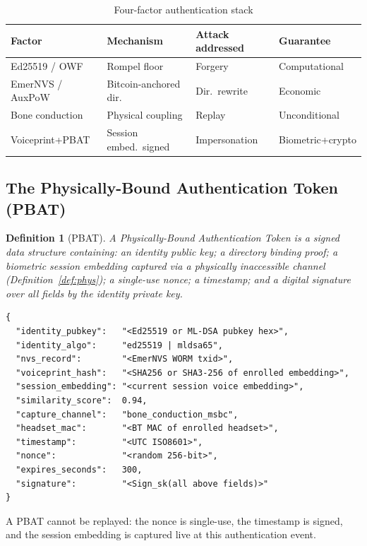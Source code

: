 \documentclass[12pt,a4paper]{article}
\newtheorem{definition}{Definition}
\begin{document}
\begin{table}[H]
\caption{Four-factor authentication stack}
\label{tab:stack}
\small\renewcommand{\arraystretch}{1.3}
\begin{tabular}{P{2.8cm}P{2.8cm}P{2.8cm}P{2.8cm}}
\toprule
\textbf{Factor} & \textbf{Mechanism} & \textbf{Attack addressed}
  & \textbf{Guarantee}\\
\midrule
Ed25519 / OWF    & Rompel floor           & Forgery
  & Computational\\
EmerNVS / AuxPoW & Bitcoin-anchored dir.  & Dir.\ rewrite
  & Economic\\
Bone conduction  & Physical coupling      & Replay
  & Unconditional\\
Voiceprint+PBAT  & Session embed.\ signed & Impersonation
  & Biometric+crypto\\
\bottomrule
\end{tabular}
\end{table}

\subsection{The Physically-Bound Authentication Token (PBAT)}

\begin{definition}[PBAT]
\label{def:pbat}
A \emph{Physically-Bound Authentication Token} is a signed data
structure containing: an identity public key; a directory binding proof;
a biometric session embedding captured via a physically inaccessible
channel (Definition~\ref{def:phys}); a single-use nonce; a timestamp;
and a digital signature over all fields by the identity private key.
\end{definition}

\begin{verbatim}
{
  "identity_pubkey":   "<Ed25519 or ML-DSA pubkey hex>",
  "identity_algo":     "ed25519 | mldsa65",
  "nvs_record":        "<EmerNVS WORM txid>",
  "voiceprint_hash":   "<SHA256 or SHA3-256 of enrolled embedding>",
  "session_embedding": "<current session voice embedding>",
  "similarity_score":  0.94,
  "capture_channel":   "bone_conduction_msbc",
  "headset_mac":       "<BT MAC of enrolled headset>",
  "timestamp":         "<UTC ISO8601>",
  "nonce":             "<random 256-bit>",
  "expires_seconds":   300,
  "signature":         "<Sign_sk(all above fields)>"
}
\end{verbatim}

A PBAT cannot be replayed: the nonce is single-use, the timestamp is
signed, and the session embedding is captured live at this authentication
event.
\end{document}
